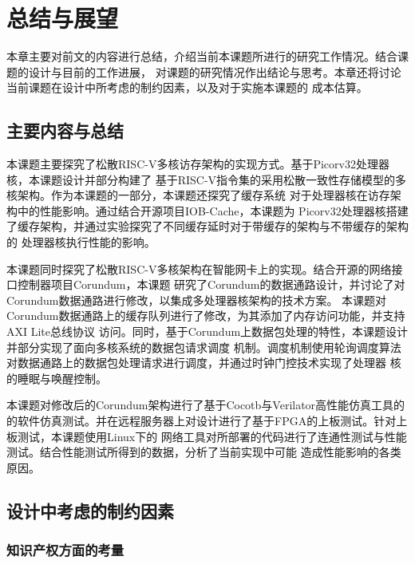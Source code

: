 \section{总结与展望}

本章主要对前文的内容进行总结，介绍当前本课题所进行的研究工作情况。结合课题的设计与目前的工作进展，
对课题的研究情况作出结论与思考。本章还将讨论当前课题在设计中所考虑的制约因素，以及对于实施本课题的
成本估算。

\subsection{主要内容与总结}

本课题主要探究了松散RISC-V多核访存架构的实现方式。基于Picorv32处理器核，本课题设计并部分构建了
基于RISC-V指令集的采用松散一致性存储模型的多核架构。作为本课题的一部分，本课题还探究了缓存系统
对于处理器核在访存架构中的性能影响。通过结合开源项目IOB-Cache\cite{roque2021iob}，本课题为
Picorv32处理器核搭建了缓存架构，并通过实验探究了不同缓存延时对于带缓存的架构与不带缓存的架构的
处理器核执行性能的影响。

本课题同时探究了松散RISC-V多核架构在智能网卡上的实现。结合开源的网络接口控制器项目Corundum\cite{forencich2020corundum}，本课题
研究了Corundum的数据通路设计，并讨论了对Corundum数据通路进行修改，以集成多处理器核架构的技术方案。
本课题对Corundum数据通路上的缓存队列进行了修改，为其添加了内存访问功能，并支持AXI Lite总线协议
访问。同时，基于Corundum上数据包处理的特性，本课题设计并部分实现了面向多核系统的数据包请求调度
机制。调度机制使用轮询调度算法对数据通路上的数据包处理请求进行调度，并通过时钟门控技术实现了处理器
核的睡眠与唤醒控制。

本课题对修改后的Corundum架构进行了基于Cocotb\cite{cocotb_doc}与Verilator\cite{verilator_website}高性能仿真工具的
的软件仿真测试。并在远程服务器上对设计进行了基于FPGA的上板测试。针对上板测试，本课题使用Linux下的
网络工具对所部署的代码进行了连通性测试与性能测试。结合性能测试所得到的数据，分析了当前实现中可能
造成性能影响的各类原因。

\subsection{设计中考虑的制约因素}


\subsubsection{知识产权方面的考量}

